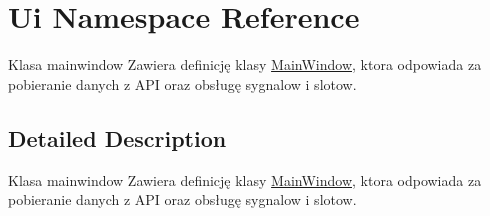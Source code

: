 \hypertarget{namespace_ui}{}\section{Ui Namespace Reference}
\label{namespace_ui}


Klasa mainwindow Zawiera definicję klasy \hyperlink{class_main_window}{Main\+Window}, ktora odpowiada za pobieranie danych z A\+PI oraz obsługę sygnalow i slotow.  




\subsection{Detailed Description}
Klasa mainwindow Zawiera definicję klasy \hyperlink{class_main_window}{Main\+Window}, ktora odpowiada za pobieranie danych z A\+PI oraz obsługę sygnalow i slotow. 